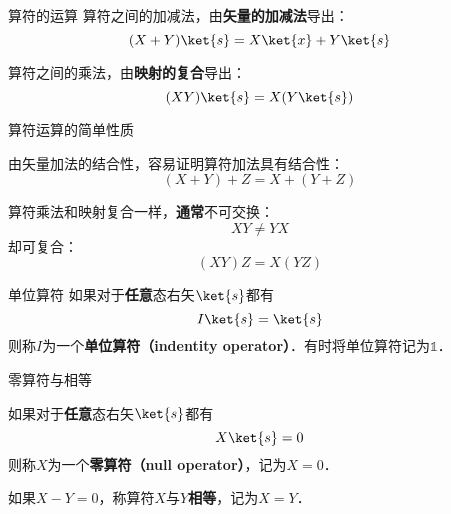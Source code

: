 \begin{definition}{算符的运算}\label{QMPrcp_def8}
算符之间的加减法，由\textbf{矢量的加减法}导出：
\begin{equation}
(X+Y)\ket{s} = X\ket{x}+Y\ket{s}
\end{equation}

算符之间的乘法，由\textbf{映射的复合}导出：
\begin{equation}
(XY)\ket{s} = X(Y\ket{s})
\end{equation}
\end{definition}


\begin{theorem}{算符运算的简单性质}\label{QMPrcp_the4}

由矢量加法的结合性，容易证明算符加法具有结合性：
\begin{equation}
(X+Y)+Z=X+(Y+Z)
\end{equation}

算符乘法和映射复合一样，\textbf{通常}不可交换：
\begin{equation}\label{QMPrcp_eq6}
XY\neq YX
\end{equation}
却可复合：
\begin{equation}
(XY)Z=X(YZ)
\end{equation}


\end{theorem}

\begin{definition}{单位算符}\label{QMPrcp_def9}
如果对于\textbf{任意}态右矢$\ket{s}$都有
\begin{equation}
I\ket{s} = \ket{s}
\end{equation}
则称$I$为一个\textbf{单位算符（indentity operator）}．有时将单位算符记为$\mathbb{1}$．
\end{definition}



\begin{definition}{零算符与相等}\label{QMPrcp_def10}

如果对于\textbf{任意}态右矢$\ket{s}$都有
\begin{equation}
X\ket{s} = 0
\end{equation}
则称$X$为一个\textbf{零算符（null operator）}，记为$X=0$．

如果$X-Y=0$，称算符$X$与$Y$\textbf{相等}，记为$X=Y$．

\end{definition}








